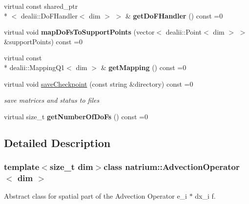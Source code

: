\begin{DoxyCompactItemize}
\item 
\hypertarget{classnatrium_1_1AdvectionOperator_a68f51edd8cc34b61f32ded0a8db82f7b}{virtual const shared\-\_\-ptr\\*
$<$ dealii\-::\-Do\-F\-Handler$<$ dim $>$ $>$ \& {\bfseries get\-Do\-F\-Handler} () const =0}\label{classnatrium_1_1AdvectionOperator_a68f51edd8cc34b61f32ded0a8db82f7b}

\item 
\hypertarget{classnatrium_1_1AdvectionOperator_adc118010e30df45b5906d35743e5ec2e}{virtual void {\bfseries map\-Do\-Fs\-To\-Support\-Points} (vector$<$ dealii\-::\-Point$<$ dim $>$ $>$ \&support\-Points) const =0}\label{classnatrium_1_1AdvectionOperator_adc118010e30df45b5906d35743e5ec2e}

\item 
\hypertarget{classnatrium_1_1AdvectionOperator_a419e94f5534d7871cee47c027a2501c4}{virtual const \\*
dealii\-::\-Mapping\-Q1$<$ dim $>$ \& {\bfseries get\-Mapping} () const =0}\label{classnatrium_1_1AdvectionOperator_a419e94f5534d7871cee47c027a2501c4}

\item 
virtual void \hyperlink{classnatrium_1_1AdvectionOperator_aca14260bae100874b0050a2a96d7a564}{save\-Checkpoint} (const string \&directory) const =0
\begin{DoxyCompactList}\small\item\em save matrices and status to files \end{DoxyCompactList}\item 
\hypertarget{classnatrium_1_1AdvectionOperator_a251e21d1dd023926d4c5f7fd973b90bf}{virtual size\-\_\-t {\bfseries get\-Number\-Of\-Do\-Fs} () const =0}\label{classnatrium_1_1AdvectionOperator_a251e21d1dd023926d4c5f7fd973b90bf}

\end{DoxyCompactItemize}


\subsection{Detailed Description}
\subsubsection*{template$<$size\-\_\-t dim$>$class natrium\-::\-Advection\-Operator$<$ dim $>$}

Abstract class for spatial part of the Advection Operator e\-\_\-i $\ast$ dx\-\_\-i f. 


